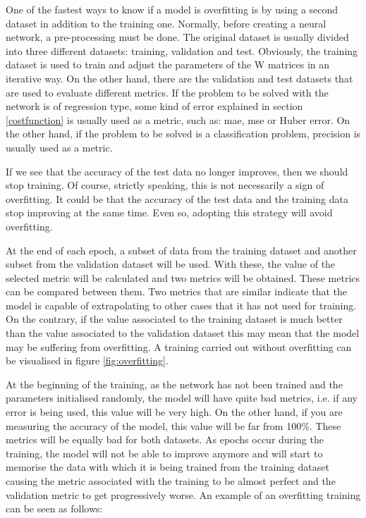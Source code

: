 One of the fastest ways to know if a model is overfitting is by using a second dataset in addition to the training one. Normally, before creating a neural network, a pre-processing must be done. The original dataset is usually divided into three different datasets: training, validation and test. Obviously, the training dataset is used to train and adjust the parameters of the W matrices in an iterative way. On the other hand, there are the validation and test datasets that are used to evaluate different metrics. If the problem to be solved with the network is of regression type, some kind of error explained in section \ref{costfunction} is usually used as a metric, such as: \acrshort{mae}, \acrshort{mse} or Huber error. On the other hand, if the problem to be solved is a classification problem, precision is usually used as a metric.
\newline

If we see that the accuracy of the test data no longer improves, then we should stop training. Of course, strictly speaking, this is not necessarily a sign of overfitting. It could be that the accuracy of the test data and the training data stop improving at the same time. Even so, adopting this strategy will avoid overfitting.
\newline

At the end of each epoch, a subset of data from the training dataset and another subset from the validation dataset will be used. With these, the value of the selected metric will be calculated and two metrics will be obtained. These metrics can be compared between them. Two metrics that are similar indicate that the model is capable of extrapolating to other cases that it has not used for training. On the contrary, if the value associated to the training dataset is much better than the value associated to the validation dataset this may mean that the model may be suffering from overfitting. A training carried out without overfitting can be visualised in figure \ref{fig:overfitting}.
\newline

At the beginning of the training, as the network has not been trained and the parameters initialised randomly, the model will have quite bad metrics, i.e. if any error is being used, this value will be very high. On the other hand, if you are measuring the accuracy of the model, this value will be far from 100\%. These metrics will be equally bad for both datasets. As epochs occur during the training, the model will not be able to improve anymore and will start to memorise the data with which it is being trained from the training dataset causing the metric associated with the training to be almost perfect and the validation metric to get progressively worse. An example of an overfitting training can be seen as follows:
\newline


